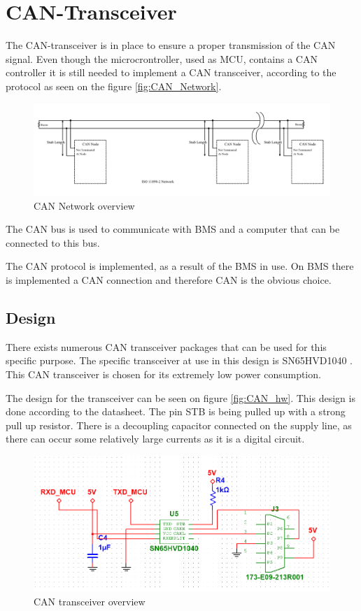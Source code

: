 \newpage
\section{CAN-Transceiver}
\label{sec:CAN-Tranceiver}
The CAN-transceiver is in place to ensure a proper transmission of the CAN signal. Even though the microcrontroller, used as MCU, contains a CAN controller it is still needed to implement a CAN transceiver, according to the protocol as seen on the figure \vref{fig:CAN_Network}.

\begin{figure}[H]
	\centering
	\includegraphics[width=0.7\linewidth]{Hardware/Pictures/CAN_Network}
	\caption{CAN Network overview}
	\label{fig:CAN_Network}
\end{figure}


The CAN bus is used to communicate with BMS and a computer that can be connected to this bus. 

The CAN protocol is implemented, as a result of the BMS in use. On BMS there is implemented a CAN connection and therefore CAN is the obvious choice.    

\subsection{Design}
There exists numerous CAN transceiver packages that can be used for this specific purpose. The specific transceiver at use in this design is SN65HVD1040 \cite{CAN}. This CAN transceiver is chosen for its extremely low power consumption. 

The design for the transceiver can be seen on figure \vref{fig:CAN_hw}. This design is done according to the datasheet. The pin STB is being pulled up with a strong pull up resistor. There is a decoupling capacitor connected on the supply line, as there can occur some relatively large currents as it is a digital circuit. 

\begin{figure}[H]
	\centering
	\includegraphics[width=0.7\linewidth]{Hardware/Pictures/CAN_transceiver}
	\caption{CAN transceiver overview}
	\label{fig:CAN_hw}
\end{figure}

